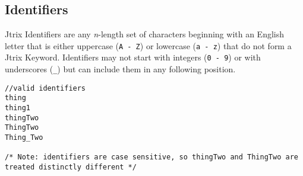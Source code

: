 \documentclass[12pt]{report}
\begin{document}
\subsection{Identifiers}
Jtrix Identifiers are any \textit{n}-length set of characters beginning with an English letter that is either uppercase (\texttt{A - Z}) or lowercase (\texttt{a - z}) that do not form a Jtrix Keyword. Identifiers may not start with integers (\texttt{0 - 9}) or with underscores (\texttt{\_}) but can include them in any following position.
\begin{lstlisting}
//valid identifiers
thing
thing1
thingTwo
ThingTwo
Thing_Two

/* Note: identifiers are case sensitive, so thingTwo and ThingTwo are treated distinctly different */
\end{lstlisting}
\end{document}
